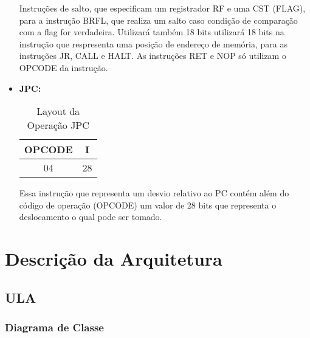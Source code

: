 \documentclass{report}
\begin{document}
\begin{itemize}
  Instruções de salto, que especificam um registrador RF e uma CST (FLAG), para a instrução BRFL, que realiza um salto caso condição de comparação com a flag for verdadeira. Utilizará também 18 bits  utilizará 18 bits na instrução que respresenta uma posição de endereço de memória, para as instruções JR, CALL e HALT. As instruções RET e NOP só utilizam o OPCODE da instrução.\\
  
    \item \textbf{JPC:}

  \begin{table}[H]
\centering
	\begin{tabular}{|c|c|}
  	\hline 
  	\textbf{OPCODE} & \textbf{I} \\ 
  	\hline 
  	04 & 28 \\ 
  	\hline 
  	\end{tabular} 
  	\caption{Layout da Operação JPC}
  \end{table}
  
  Essa instrução que representa um desvio relativo ao PC contém além do código de operação (OPCODE) um valor de 28 bits que representa o deslocamento o qual pode ser tomado.
  
  \end{itemize}

\chapter{Descrição da Arquitetura}

  \section{ULA}

    \subsection{Diagrama de Classe}
    \begin{figure}[H]
	\centering
      \end{figure}      
     
\end{document}
